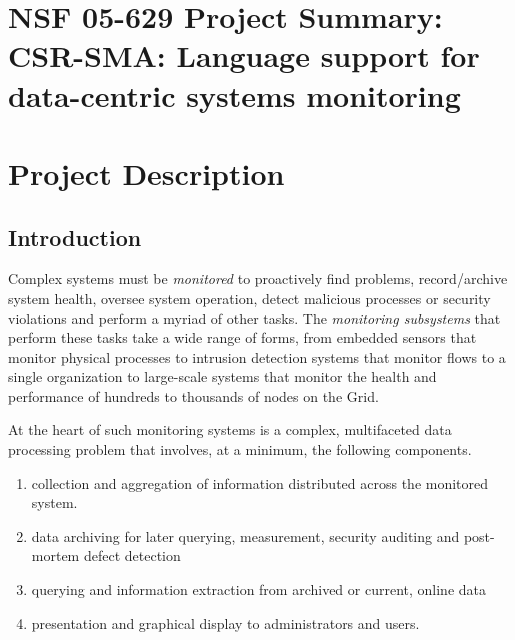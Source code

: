 \documentclass[10pt]{article}
\begin{document}
\setcounter{page}{1}
\appendix
\section{NSF 05-629 Project Summary:  \\
CSR-SMA: Language support for data-centric systems monitoring
}

\newpage
\setcounter{page}{1}

\section{Project Description}


\subsection{Introduction}
\label{ssec:intro}

Complex systems must be {\em monitored} to proactively find problems,
record/archive system health, oversee system operation, detect
malicious processes or security violations and perform a myriad of other tasks.
The {\em monitoring subsystems} 
that perform these tasks take a wide range of forms, 
from embedded sensors that monitor physical processes to
intrusion detection systems that monitor flows to a single
organization  
to large-scale systems
that monitor the health and performance of hundreds to thousands of nodes
on the Grid.

At the heart of such monitoring systems is a complex, multifaceted
data processing problem that involves, at a minimum, the following components.
\begin{enumerate}
\item collection and aggregation of information 
distributed across the monitored system.
\item data archiving for later querying, measurement, security auditing and 
post-mortem defect detection
\item querying and information extraction from archived or current, online data
\item presentation and graphical display to administrators and users.
\end{enumerate}
\end{document}
